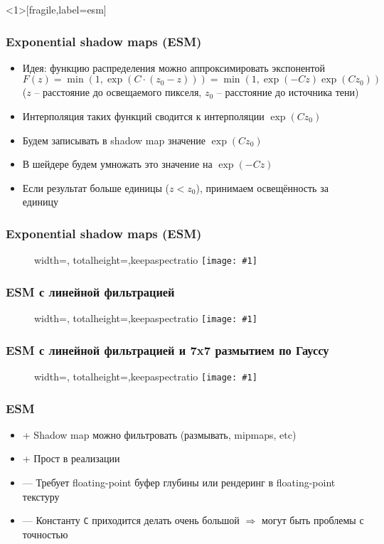 \documentclass[10pt]{beamer}
\newcommand{\slideimage}[1]{
  \begin{figure}
    \begin{adjustbox}{width=\textwidth, totalheight=\textheight-2\baselineskip-2\baselineskip,keepaspectratio}
      \texttt{[image: \#1]}
    \end{adjustbox}
  \end{figure}
}
\begin{document}
\begin{frame}<1>[fragile,label=esm]
\frametitle{Exponential shadow maps (ESM)}
\begin{itemize}
\item Идея: функцию распределения можно аппроксимировать экспонентой \begin{math}F(z) = \min(1, \exp(C \cdot (z_0 - z))) = \min(1, \exp(-Cz)\exp(Cz_0))\end{math} (\begin{math}z\end{math} -- расстояние до освещаемого пикселя, \begin{math}z_0\end{math} -- расстояние до источника тени)
\pause
\item Интерполяция таких функций сводится к интерполяции \begin{math}\exp(Cz_0)\end{math}
\pause
\item Будем записывать в shadow map значение \begin{math}\exp(Cz_0)\end{math}
\pause
\item В шейдере будем умножать это значение на \begin{math}\exp(-Cz)\end{math}
\pause
\item Если результат больше единицы (\begin{math}z < z_0\end{math}), принимаем освещённость за единицу
\end{itemize}
\end{frame}

\begin{frame}[fragile]
\frametitle{Exponential shadow maps (ESM)}
\slideimage{exp_plot.png}
\end{frame}


\begin{frame}[fragile]
\frametitle{ESM с линейной фильтрацией}
\slideimage{exp.png}
\end{frame}

\begin{frame}[fragile]
\frametitle{ESM с линейной фильтрацией и 7x7 размытием по Гауссу}
\slideimage{exp_gauss.png}
\end{frame}

\begin{frame}[fragile]
\frametitle{ESM}
\begin{itemize}
\item {\color{green}+} Shadow map можно фильтровать (размывать, mipmaps, etc)
\item {\color{green}+} Прост в реализации
\item {\color{red}—} Требует floating-point буфер глубины или рендеринг в floating-point текстуру
\item {\color{red}—} Константу \verb|C| приходится делать очень большой \begin{math}\Rightarrow\end{math} могут быть проблемы с точностью
\end{itemize}
\end{frame}
\end{document}
